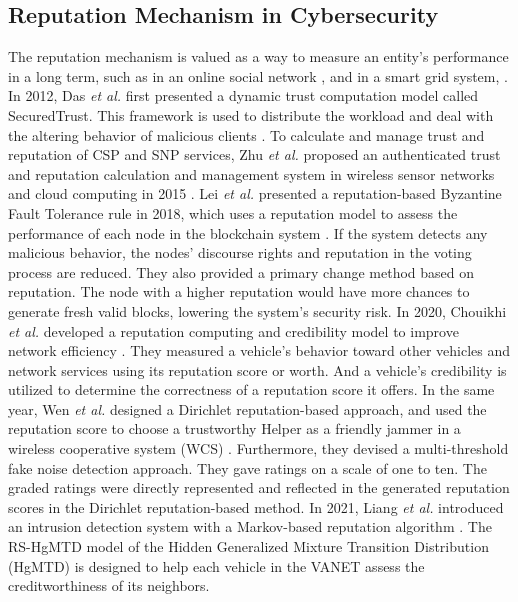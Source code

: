 \documentclass[journal]{IEEEtran}
\begin{document}
\subsection{Reputation Mechanism in Cybersecurity}
The reputation mechanism is valued as a way to measure an entity's performance in a long term, such as in an online social network \cite{ref_27_reputation}, and in a smart grid system, \cite{ref_41_reputation, ref_44_reputation}.
In 2012, Das \textit{et al.} first presented a dynamic trust computation model called SecuredTrust. This framework is used to distribute the workload and deal with the altering behavior of malicious clients \cite{ref_48_reputation}.
To calculate and manage trust and reputation of CSP and SNP services, Zhu \textit{et al.} proposed an authenticated trust and reputation calculation and management system in wireless sensor networks and cloud computing in 2015 \cite{ref_47_reputation}.
Lei \textit{et al.} presented a reputation-based Byzantine Fault Tolerance rule in 2018, which uses a reputation model to assess the performance of each node in the blockchain system \cite{ref_25_reputation}. If the system detects any malicious behavior, the nodes' discourse rights and reputation in the voting process are reduced. They also provided a primary change method based on reputation. The node with a higher reputation would have more chances to generate fresh valid blocks, lowering the system's security risk.
In 2020, Chouikhi \textit{et al.} developed a reputation computing and credibility model to improve network efficiency \cite{ref_23_reputation}. They measured a vehicle's behavior toward other vehicles and network services using its reputation score or worth. And a vehicle's credibility is utilized to determine the correctness of a reputation score it offers.
In the same year, Wen \textit{et al.} designed a Dirichlet reputation-based approach, and used the reputation score to choose a trustworthy Helper as a friendly jammer in a wireless cooperative system (WCS) \cite{ref_24_reputation}. Furthermore, they devised a multi-threshold fake noise detection approach. They gave ratings on a scale of one to ten. The graded ratings were directly represented and reflected in the generated reputation scores in the Dirichlet reputation-based method.
In 2021, Liang \textit{et al.} introduced an intrusion detection system with a Markov-based reputation algorithm \cite{ref_46_reputation}. The RS-HgMTD model of the Hidden Generalized Mixture Transition Distribution (HgMTD) is designed to help each vehicle in the VANET assess the creditworthiness of its neighbors.
\end{document}
